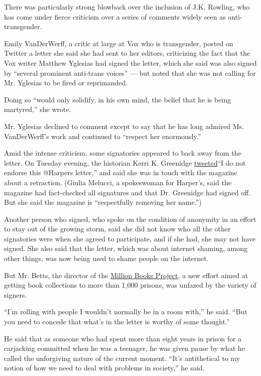 There was particularly strong blowback over the inclusion of J.K.
Rowling, who has come under fierce criticism over a series of comments
widely seen as anti-transgender.

Emily VanDerWerff, a critic at large at Vox who is transgender, posted
on Twitter a letter she said she had sent to her editors, criticizing
the fact that the Vox writer Matthew Yglesias had signed the letter,
which she said was also signed by ``several prominent anti-trans
voices'' --- but noted that she was not calling for Mr. Yglesias to be
fired or reprimanded.

Doing so ``would only solidify, in his own mind, the belief that he is
being martyred,'' she wrote.

Mr. Yglesias declined to comment except to say that he has long admired
Ms. VanDerWerff's work and continued to ``respect her enormously.''

Amid the intense criticism, some signatories appeared to back away from
the letter. On Tuesday evening, the historian Kerri K. Greenidge
\href{https://twitter.com/GreenidgeKerri/status/1280608456152678406?s=20}{tweeted}``I
do not endorse this @Harpers letter,'' and said she was in touch with
the magazine about a retraction. (Giulia Melucci, a spokeswoman for
Harper's, said the magazine had fact-checked all signatures and that Dr.
Greenidge had signed off. But she said the magazine is ``respectfully
removing her name.'')

Another person who signed, who spoke on the condition of anonymity in an
effort to stay out of the growing storm, said she did not know who all
the other signatories were when she agreed to participate, and if she
had, she may not have signed. She also said that the letter, which was
about internet shaming, among other things, was now being used to shame
people on the internet.

But Mr. Betts, the director of the
\href{https://www.nytimes.com/2020/06/30/arts/mellon-foundation-elizabeth-alexander.html}{Million
Books Project}, a new effort aimed at getting book collections to more
than 1,000 prisons, was unfazed by the variety of signers.

``I'm rolling with people I wouldn't normally be in a room with,'' he
said. ``But you need to concede that what's in the letter is worthy of
some thought.''

He said that as someone who had spent more than eight years in prison
for a carjacking committed when he was a teenager, he was given pause by
what he called the unforgiving nature of the current moment. ``It's
antithetical to my notion of how we need to deal with problems in
society,'' he said.

